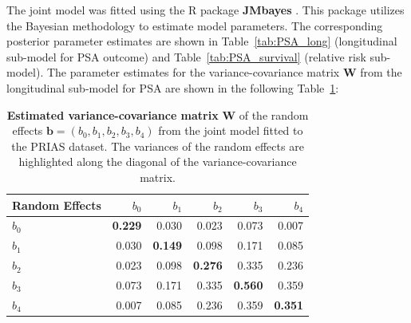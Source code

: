 The joint model was fitted using the R package \textbf{JMbayes} \citep{rizopoulosJMbayes}. This package utilizes the Bayesian methodology to estimate model parameters. The corresponding posterior parameter estimates are shown in Table~\ref{tab:PSA_long} (longitudinal sub-model for PSA outcome) and Table~\ref{tab:PSA_survival} (relative risk sub-model). The parameter estimates for the variance-covariance matrix $\boldsymbol{W}$ from the longitudinal sub-model for PSA are shown in the following Table~\ref{tab:D_matrix}:
\begin{table}
\small\sf\centering
\caption{\textbf{Estimated variance-covariance matrix} $\boldsymbol{W}$ of the random effects ${\boldsymbol{b}=(b_{0}, b_{1}, b_{2}, b_{3}, b_{4})}$ from the joint model fitted to the PRIAS dataset. The variances of the random effects are highlighted along the diagonal of the variance-covariance matrix.}
\label{tab:D_matrix}
\begin{tabular}{lrrrrr}
\hline
Random Effects    & $b_{0}$    & $b_{1}$   & $b_{2}$   & $b_{3}$   & $b_{4}$    \\
\hline
$b_{0}$ & \textbf{0.229} & 0.030 & 0.023 & 0.073 & 0.007 \\
$b_{1}$ & 0.030 & \textbf{0.149} & 0.098 & 0.171 & 0.085 \\
$b_{2}$ & 0.023 & 0.098 & \textbf{0.276} & 0.335 & 0.236 \\
$b_{3}$ & 0.073 & 0.171 & 0.335 & \textbf{0.560} & 0.359 \\
$b_{4}$ & 0.007 & 0.085 & 0.236 & 0.359 & \textbf{0.351} \\
\hline
\end{tabular}
\end{table}

